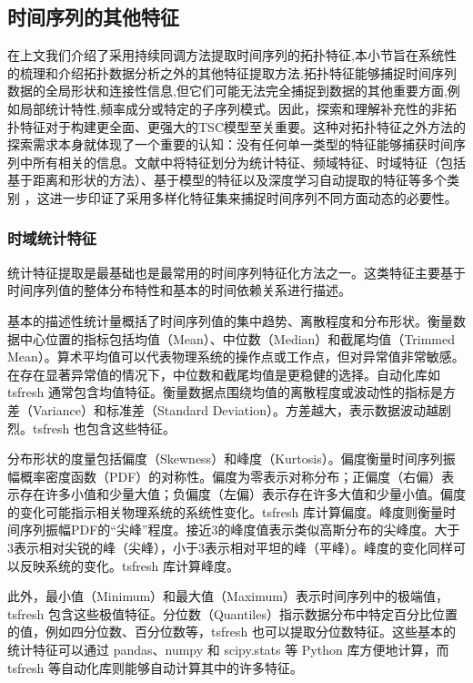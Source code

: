 \subsection{时间序列的其他特征}
\label{sec:other_ts_features}
在上文我们介绍了采用持续同调方法提取时间序列的拓扑特征,本小节旨在系统性的梳理和介绍拓扑数据分析之外的其他特征提取方法.拓扑特征能够捕捉时间序列数据的全局形状和连接性信息,但它们可能无法完全捕捉到数据的其他重要方面,例如局部统计特性,频率成分或特定的子序列模式。因此，探索和理解补充性的非拓扑特征对于构建更全面、更强大的TSC模型至关重要。这种对拓扑特征之外方法的探索需求本身就体现了一个重要的认知：没有任何单一类型的特征能够捕获时间序列中所有相关的信息。文献中将特征划分为统计特征、频域特征、时域特征（包括基于距离和形状的方法）、基于模型的特征以及深度学习自动提取的特征等多个类别 ，这进一步印证了采用多样化特征集来捕捉时间序列不同方面动态的必要性。
\subsubsection{时域统计特征}
\label{sec:ts_distances}
统计特征提取是最基础也是最常用的时间序列特征化方法之一。这类特征主要基于时间序列值的整体分布特性和基本的时间依赖关系进行描述。

基本的描述性统计量\cite{box2015time}概括了时间序列值的集中趋势、离散程度和分布形状。衡量数据中心位置的指标包括均值（Mean）、中位数（Median）和截尾均值（Trimmed Mean）。算术平均值可以代表物理系统的操作点或工作点，但对异常值非常敏感。在存在显著异常值的情况下，中位数和截尾均值是更稳健的选择。自动化库如 tsfresh\cite{christ2018time} 通常包含均值特征。衡量数据点围绕均值的离散程度或波动性的指标是方差（Variance）和标准差（Standard Deviation）。方差越大，表示数据波动越剧烈。tsfresh 也包含这些特征。

分布形状的度量包括偏度（Skewness）和峰度（Kurtosis）。偏度衡量时间序列振幅概率密度函数（PDF）的对称性。偏度为零表示对称分布；正偏度（右偏）表示存在许多小值和少量大值；负偏度（左偏）表示存在许多大值和少量小值。偏度的变化可能指示相关物理系统的系统性变化。tsfresh 库计算偏度。峰度则衡量时间序列振幅PDF的“尖峰”程度。接近3的峰度值表示类似高斯分布的尖峰度。大于3表示相对尖锐的峰（尖峰），小于3表示相对平坦的峰（平峰）。峰度的变化同样可以反映系统的变化。tsfresh 库计算峰度。

此外，最小值（Minimum）和最大值（Maximum）表示时间序列中的极端值，tsfresh 包含这些极值特征。分位数（Quantiles）指示数据分布中特定百分比位置的值，例如四分位数、百分位数等，tsfresh 也可以提取分位数特征。这些基本的统计特征可以通过 pandas、numpy 和 scipy.stats 等 Python 库方便地计算，而 tsfresh 等自动化库则能够自动计算其中的许多特征。

